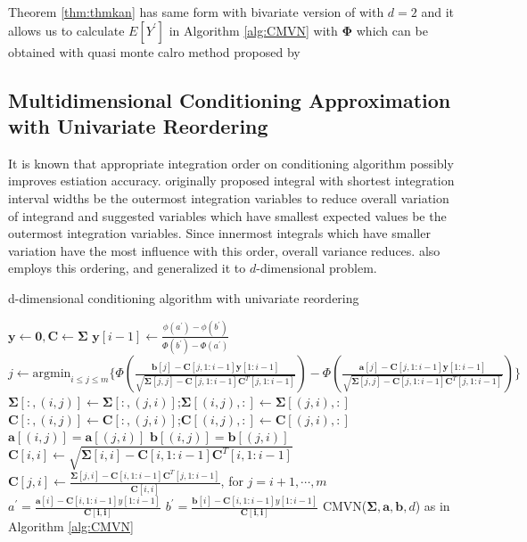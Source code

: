 Theorem \ref{thm:thmkan} has same form with bivariate version of \citet{trinh2015bivariate} with $d=2$ and it allows us to calculate $E[Y^\prime]$ in Algorithm \ref{alg:CMVN} with $\boldsymbol{\Phi}$ which can be obtained with quasi monte calro method proposed by \citet{genz2009computation}

\subsection{Multidimensional Conditioning Approximation with Univariate Reordering}
It is known that appropriate integration order on conditioning algorithm possibly improves estiation accuracy. \citet{schervish1984algorithm} originally proposed integral with shortest integration interval widths be the outermost integration variables to reduce overall variation of integrand and \citet{gibson1994monte} suggested variables which have smallest expected values be the outermost integration variables. Since innermost integrals which have smaller variation have the most influence with this order, overall variance reduces.
\citet{trinh2015bivariate} also employs this ordering, and \citet{cao2019hierarchical} generalized it to $d$-dimensional problem.
\begin{algorithm}[H]
	\caption{d-dimensional conditioning algorithm with univariate reordering}
	\begin{algorithmic}[1]
		\State $\mathbf{y}\leftarrow\mathbf{0},\mathbf{C}\leftarrow\boldsymbol{\Sigma}$
		\State $\mathbf{y}[i-1]\leftarrow\frac{\phi(a^\prime)-\phi(b^\prime)}{\Phi(b^\prime)-\Phi(a^\prime)}$
		\EndIf
		\State $j\leftarrow\text{argmin}_{i\leq j\leq m}\{\Phi(\frac{\mathbf{b}[j]-\mathbf{C}[j,1:i-1]\mathbf{y}[1:i-1]}{\sqrt{\boldsymbol{\Sigma}[j,j]-\mathbf{C}[j,1:i-1]\mathbf{C}^T[j,1:i-1]}})-\Phi(\frac{\mathbf{a}[j]-\mathbf{C}[j,1:i-1]\mathbf{y}[1:i-1]}{\sqrt{\boldsymbol{\Sigma}[j,j]-\mathbf{C}[j,1:i-1]\mathbf{C}^T[j,1:i-1]}})\}$
		\State $\boldsymbol{\Sigma}[:,(i,j)]\leftarrow\boldsymbol{\Sigma}[:,(j,i)]$;$\boldsymbol{\Sigma}[(i,j),:]\leftarrow\boldsymbol{\Sigma}[(j,i),:]$
		\State $\mathbf{C}[:,(i,j)]\leftarrow\mathbf{C}[:,(j,i)]$;$\mathbf{C}[(i,j),:]\leftarrow\mathbf{C}[(j,i),:]$
		\State $\mathbf{a}[(i,j)]=\mathbf{a}[(j,i)]$
		\State $\mathbf{b}[(i,j)]=\mathbf{b}[(j,i)]$
		\State $\mathbf{C}[i,i]\leftarrow\sqrt{\boldsymbol{\Sigma}[i,i]-\mathbf{C}[i,1:i-1]\mathbf{C}^T[i,1:i-1]}$
		\State $\mathbf{C}[j,i]\leftarrow \frac{\boldsymbol{\Sigma}[j,i]-\mathbf{C}[i,1:i-1]\mathbf{C}^T[j,1:i-1]}{\mathbf{C}[i,i]}$, for $j=i+1,\cdots,m$
		\State $a^\prime=\frac{\mathbf{a}[i]-\mathbf{C}[i,1:i-1]y[1:i-1]}{\mathbf{C[i,i]}}$
		\State $b^\prime=\frac{\mathbf{b}[i]-\mathbf{C}[i,1:i-1]y[1:i-1]}{\mathbf{C[i,i]}}$
		\EndFor
		\State\Return CMVN($\boldsymbol{\Sigma},\mathbf{a},\mathbf{b},d$) as in Algorithm \ref{alg:CMVN}
		\EndProcedure
	\end{algorithmic}\label{alg:RCMVN}
\end{algorithm}
